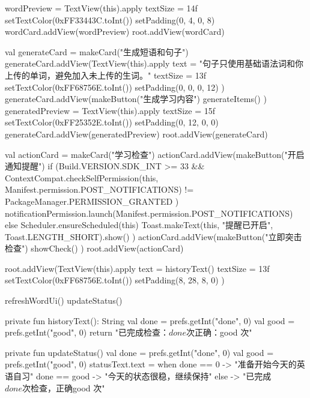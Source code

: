 {{        wordPreview = TextView(this).apply {
            textSize = 14f
            setTextColor(0xFF33443C.toInt())
            setPadding(0, 4, 0, 8)
        }
        wordCard.addView(wordPreview)
        root.addView(wordCard)

        val generateCard = makeCard("生成短语和句子")
        generateCard.addView(TextView(this).apply {
            text = "句子只使用基础语法词和你上传的单词，避免加入未上传的生词。"
            textSize = 13f
            setTextColor(0xFF68756E.toInt())
            setPadding(0, 0, 0, 12)
        })
        generateCard.addView(makeButton("生成学习内容") {
            generateItems()
        })
        generatedPreview = TextView(this).apply {
            textSize = 15f
            setTextColor(0xFF25352E.toInt())
            setPadding(0, 12, 0, 0)
        }
        generateCard.addView(generatedPreview)
        root.addView(generateCard)

        val actionCard = makeCard("学习检查")
        actionCard.addView(makeButton("开启通知提醒") {
            if (Build.VERSION.SDK_INT >= 33 &&
                ContextCompat.checkSelfPermission(this, Manifest.permission.POST_NOTIFICATIONS) !=
                PackageManager.PERMISSION_GRANTED
            ) {
                notificationPermission.launch(Manifest.permission.POST_NOTIFICATIONS)
            } else {
                Scheduler.ensureScheduled(this)
                Toast.makeText(this, "提醒已开启", Toast.LENGTH_SHORT).show()
            }
        })
        actionCard.addView(makeButton("立即突击检查") {
            showCheck()
        })
        root.addView(actionCard)

        root.addView(TextView(this).apply {
            text = historyText()
            textSize = 13f
            setTextColor(0xFF68756E.toInt())
            setPadding(8, 28, 8, 0)
        })

        refreshWordUi()
        updateStatus()
    }

    private fun historyText(): String {
        val done = prefs.getInt("done", 0)
        val good = prefs.getInt("good", 0)
        return "已完成检查：$done 次    正确：$good 次"
    }

    private fun updateStatus() {
        val done = prefs.getInt("done", 0)
        val good = prefs.getInt("good", 0)
        statusText.text = when {
            done == 0 -> "准备开始今天的英语自习"
            done == good -> "今天的状态很稳，继续保持"
            else -> "已完成 $done 次检查，正确 $good 次"
        }
    }

}
